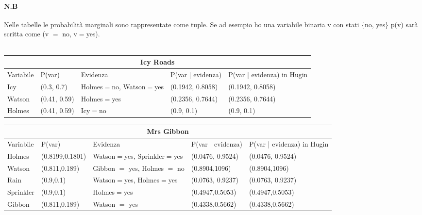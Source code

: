 \documentclass{report}
\begin{document}
\paragraph{N.B} 
Nelle tabelle le  probabilità marginali sono rappresentate come tuple. Se ad esempio ho una variabile binaria v con stati \{no, yes\} p(v) sarà scritta come (v $=$ no, v$=$yes).\\\\
\begin{table}[tbh!]
\small
\begin{tabular}{ |p{2cm}||p{2cm}|p{2cm}|p{3cm}|p{3cm}|  }
\hline
 \multicolumn{5}{|c|}{Icy Roads} \\
 \hline
 Variabile & P(var) & Evidenza & P(var | evidenza) & P(var | evidenza)  in Hugin\\
 \hline
 Icy & (0.3, 0.7) & Holmes$=$no, Watson$=$yes & (0.1942, 0.8058) & (0.1942, 0.8058)\\
\hline
 Watson & (0.41, 0.59) & Holmes$=$yes & (0.2356, 0.7644) & (0.2356, 0.7644)\\
\hline
 Holmes & (0.41, 0.59) & Icy$=$no & (0.9, 0.1) & (0.9, 0.1)\\
\hline
\end{tabular}
\newline
\vspace*{0.5 cm}
\newline

\begin{tabular}{ |p{2cm}|p{2cm}|p{2cm}|p{3cm}|p{3cm}|  }
\hline
 \multicolumn{5}{|c|}{Mrs Gibbon} \\
 \hline
Variabile & P(var) & Evidenza & P(var | evidenza) & P(var | evidenza)  in Hugin\\
 \hline
Holmes &(0.8199,0.1801) & Watson$=$yes, Sprinkler$=$yes & (0.0476, 0.9524) &(0.0476, 0.9524)\\
\hline
Watson & (0.811,0.189) & Gibbon $=$ yes, Holmes $=$ no & (0.8904,1096)& (0.8904,1096)\\
\hline
Rain & (0.9,0.1) & Watson$=$yes, Holmes$=$yes & (0.0763, 0.9237) & (0.0763, 0.9237)\\
\hline
Sprinkler & (0.9,0.1) & Holmes$=$yes & (0.4947,0.5053) & (0.4947,0.5053)\\
\hline
Gibbon & (0.811,0.189) & Watson $=$ yes & (0.4338,0.5662) & (0.4338,0.5662)\\
\hline
\end{tabular}
\end{table}
\newpage
\end{document}
